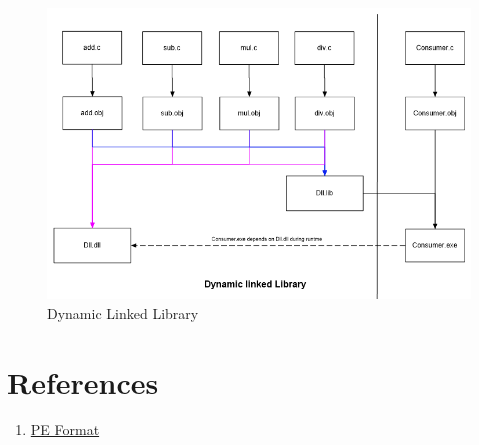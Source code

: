 \documentclass{article}
\begin{document}
\begin{figure}[H]
\centering
\includegraphics[width=\textwidth]{2.Dll.png}
\caption{Dynamic Linked Library}
\end{figure}

\section{References}
\begin{enumerate}[noitemsep]
\item \href{https://docs.microsoft.com/en-us/windows/desktop/debug/pe-format}{PE Format}
\end{enumerate}
\end{document}
